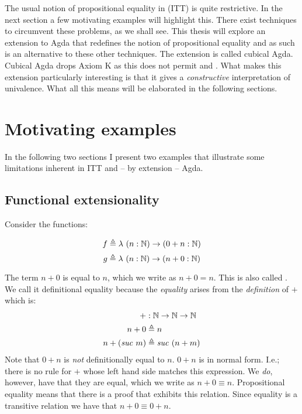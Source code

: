 The usual notion of propositional equality in  (ITT) is quite restrictive. In the next section a few
motivating examples will highlight this. There exist techniques to
circumvent these problems, as we shall see. This thesis will explore
an extension to Agda that redefines the notion of propositional
equality and as such is an alternative to these other techniques. The
extension is called cubical Agda. Cubical Agda drops Axiom K as this
does not permit  and
. What makes this extension particularly
interesting is that it gives a \emph{constructive} interpretation of
univalence. What all this means will be elaborated in the following
sections.
%
\section{Motivating examples}
%
In the following two sections I present two examples that illustrate
some limitations inherent in ITT and -- by extension -- Agda.
%
\subsection{Functional extensionality}
\label{sec:functional-extensionality}%
Consider the functions:
%
\begin{multicols}{2}
  \noindent%
  \begin{equation*}%
    f \defeq \lambda\ (n \tp \bN) \to (0 + n \tp \bN)
  \end{equation*}%
  \begin{equation*}%
    g \defeq \lambda\ (n \tp \bN) \to (n + 0 \tp \bN)
  \end{equation*}%
\end{multicols}%
%
The term $n + 0$ is
 equal to $n$, which we
write as $n + 0 = n$. This is also called
.
We call it definitional equality because the \emph{equality} arises
from the \emph{definition} of $+$ which is:
%
\begin{align*}
  +           & \tp \bN \to \bN \to \bN      \\
  n + 0       & \defeq n                   \\
  n + (\suc{m}) & \defeq \suc{(n + m)}
\end{align*}
%
Note that $0 + n$ is \emph{not} definitionally equal to $n$. $0 + n$
is in normal form. I.e.; there is no rule for $+$ whose left hand side
matches this expression. We \emph{do}, however, have that they are
 equal, which we write
as $n + 0 \equiv n$. Propositional equality means that there is a
proof that exhibits this relation. Since equality is a transitive
relation we have that $n + 0 \equiv 0 + n$.

